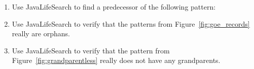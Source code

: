 \begin{multicols}{2}
\begin{problem}
\begin{enumerate}[label=\bf\color{ocre}(\alph*)]
	\item Use JavaLifeSearch to find a predecessor of the following pattern:
	
	\begin{center}
	\end{center}
	
	\item Use JavaLifeSearch to verify that the patterns from Figure~\ref{fig:goe_records} really are orphans.
	
	\item Use JavaLifeSearch to verify that the pattern from Figure~\ref{fig:grandparentless} really does not have any grandparents.
\end{enumerate}
\end{problem}

\end{multicols}
\normalsize\vspace*{0.01cm}
